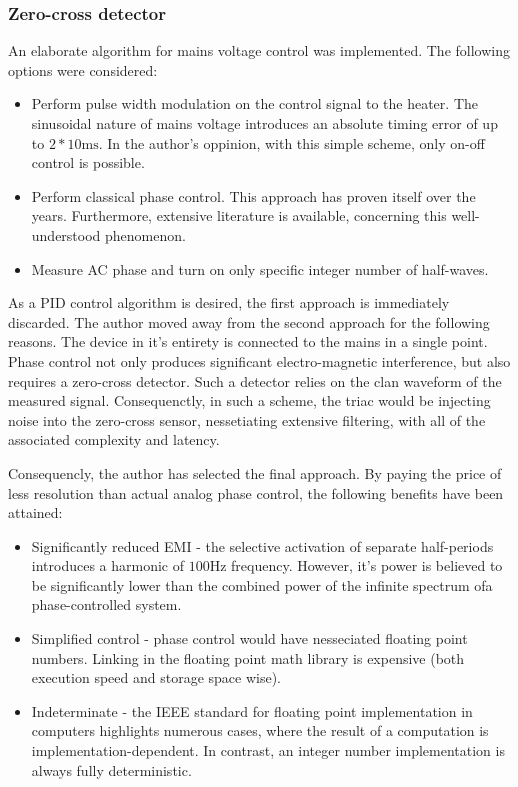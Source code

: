 \subsubsection{Zero-cross detector}
An elaborate algorithm for mains voltage control was implemented.
The following options were considered:
\begin{itemize}
\item{Perform pulse width modulation on the control signal to the heater.
The sinusoidal nature of mains voltage introduces an absolute timing error of up to $2 * 10\si{\milli\second}$.
In the author's oppinion, with this simple scheme, only on-off control is possible.}
\item{Perform classical phase control.
This approach has proven itself over the years.
Furthermore, extensive literature is available, concerning this well-understood phenomenon.}
\item{Measure AC phase and turn on only specific integer number of half-waves.}
\end{itemize}
As a PID control algorithm is desired, the first approach is immediately discarded.
The author moved away from the second approach for the following reasons.
The device in it's entirety is connected to the mains in a single point.
Phase control not only produces significant electro-magnetic interference, but also requires a zero-cross detector.
Such a detector relies on the clan waveform of the measured signal.
Consequenctly, in such a scheme, the triac would be injecting noise into the zero-cross sensor, nessetiating extensive filtering, with all of the associated complexity and latency.
\par
Consequencly, the author has selected the final approach.
By paying the price of less resolution than actual analog phase control, the following benefits have been attained:
\begin{itemize}
\item{Significantly reduced EMI - the selective activation of separate half-periods introduces a harmonic of $100\si{\hertz}$ frequency.
However, it's power is believed to be significantly lower than the combined power of the infinite spectrum ofa  phase-controlled system.}
\item{Simplified control - phase control would have nesseciated floating point numbers.
Linking in the floating point math library is expensive (both execution speed and storage space wise).}
\item{Indeterminate - the IEEE standard for floating point implementation in computers highlights numerous cases, where the result of a computation is implementation-dependent.
In contrast, an integer number implementation is always fully deterministic.}
\end{itemize}
